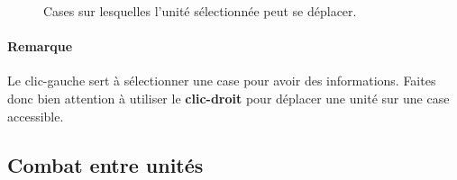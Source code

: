 		\begin{figure}[h!]
			\begin{center}
			\end{center}
			\caption{Cases sur lesquelles l'unité sélectionnée peut se déplacer.}
			\label{fig:launch}
		\end{figure}
		
		\paragraph{Remarque} Le clic-gauche sert à sélectionner une case pour avoir des informations. Faites donc bien attention à utiliser le {\bf clic-droit} pour déplacer une unité sur une case accessible.
		
		
		\subsection{Combat entre unités}
		
		
		
		